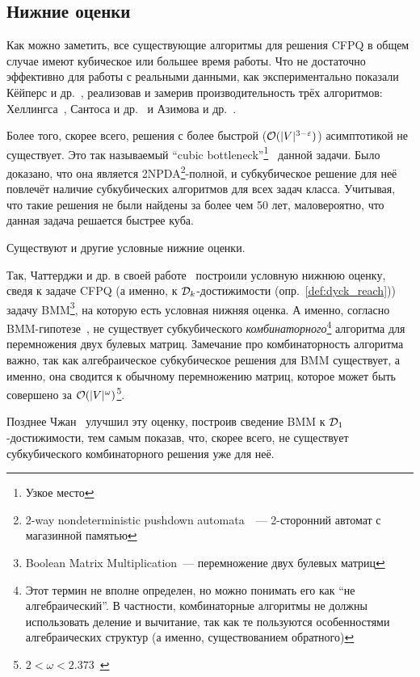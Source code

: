 \subsection{Нижние оценки}

Как можно заметить, все существующие алгоритмы для решения CFPQ в общем случае имеют кубическое или большее время работы. Что не достаточно эффективно для работы с реальными данными, как экспериментально показали Кёйперс и др.~\cite{Kuijpers19}, реализовав и замерив производительность трёх алгоритмов: Хеллингса~\cite{Hellings15}, Сантоса и др.~\cite{Santos18} и Азимова и др.~\cite{Santos18}.

Более того, скорее всего, решения с более быстрой ($\mathcal{O}(|V|^{3 - \varepsilon})$) асимптотикой не существует. Это так называемый ``cubic bottleneck''\footnote{Узкое место}~\cite{Heintze1997} данной задачи. Было доказано, что она является 2NPDA\footnote{2-way nondeterministic pushdown automata~\cite{Aho1968}~--- 2-сторонний автомат с магазинной памятью}-полной, и субкубическое решение для неё повлечёт наличие субкубических алгоритмов для всех задач класса. Учитывая, что такие решения не были найдены за более чем 50 лет, маловероятно, что данная задача решается быстрее куба. 

Существуют и другие условные нижние оценки. 

Так, Чаттерджи и др. в своей работе~\cite{Chatterjee17} построили условную нижнюю оценку, сведя к задаче CFPQ (а именно, к $\mathcal{D}_k$-достижимости (опр.~\ref{def:dyck_reach})) задачу BMM\footnote{Boolean Matrix Multiplication~--- перемножение двух булевых матриц}, на которую есть условная нижняя оценка. А именно, согласно BMM-гипотезе~\cite{Williams18}, не существует субкубического \textit{комбинаторного}\footnote{Этот термин не вполне определен, но можно понимать его как ``не алгебраический''. В частности, комбинаторные алгоритмы не должны использовать деление и вычитание, так как те пользуются особенностями алгебраических структур (а именно, существованием обратного)} алгоритма для перемножения двух булевых матриц. Замечание про комбинаторность алгоритма важно, так как алгебраическое субкубическое решения для BMM существует, а именно, она сводится к обычному перемножению матриц, которое может быть совершено за $\mathcal{O}(|V|^{\omega})$\footnote{$2 < \omega < 2.373$~\cite{Alman20}}.

Позднее Чжан~\cite{Zhang20} улучшил эту оценку, построив сведение BMM к $\mathcal{D}_1$-достижи\-мости, тем самым показав, что, скорее всего, не существует субкубического комбинаторного решения уже для неё. 

